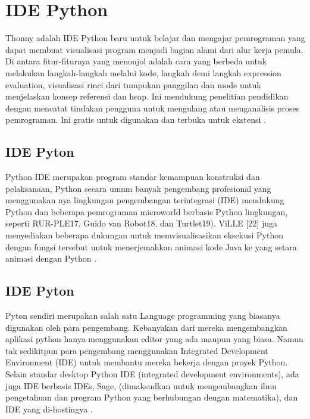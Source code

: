 

\section{IDE Python}
Thonny adalah IDE Python baru untuk belajar dan mengajar pemrograman
yang dapat membuat visualisasi program menjadi bagian alami dari alur kerja pemula.
Di antara fitur-fiturnya yang menonjol adalah cara yang berbeda untuk melakukan langkah-langkah melalui kode, langkah demi langkah expression evaluation, visualisasi rinci dari tumpukan panggilan dan mode untuk menjelaskan konsep referensi dan heap. Ini mendukung penelitian pendidikan dengan mencatat tindakan pengguna untuk mengulang atau menganalisis proses pemrograman. Ini gratis untuk digunakan dan terbuka untuk ekstensi \cite{annamaa2015introducing}.

\subsection{IDE Pyton}
Python IDE merupakan program standar kemampuan konstruksi dan pelaksanaan, Python secara umum banyak pengembang profesional yang menggunakan nya 
lingkungan pengembangan terintegrasi (IDE) mendukung
Python dan beberapa pemrograman microworld berbasis Python lingkungan, seperti RUR-PLE17, Guido van Robot18, dan Turtlet19). ViLLE [22] juga menyediakan beberapa dukungan untuk memvisualisasikan eksekusi Python dengan fungsi tersebut untuk menerjemahkan animasi kode Java ke yang setara animasi dengan Python \cite{helminen2010jype}.

\subsection{IDE Pyton}
Pyton sendiri merupakan salah satu Language programming yang biasanya digunakan oleh para pengembang. Kebanyakan dari mereka mengembangkan aplikasi python hanya menggunakan editor yang ada maupun yang biasa. Namun tak sedikitpun para pengembang menggunakan Integrated Development Environment (IDE) untuk membantu mereka bekerja dengan proyek Python. Selain standar desktop Python IDE (integrated development environments), ada juga IDE berbasis IDEs, Sage, (dimaksudkan untuk mengembangkan ilmu pengetahuan dan program Python yang berhubungan dengan matematika), dan IDE yang di-hostingya \cite{van2007pythonss}.

